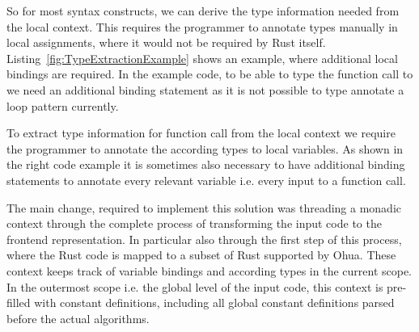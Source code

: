 So for most syntax constructs, we can derive the type information needed from the local context. This requires the programmer to annotate types manually in local assignments, where it would not be required by Rust itself. Listing~\ref{fig:TypeExtractionExample} shows an example, where additional local bindings are required. In the example code, to be able to type the function call to  we need an additional binding statement as it is not possible to type annotate a loop pattern currently. 

\begin{codefigure}[H]
\centering
\tabskip=0pt
\caption{To extract type information for function call from the local context we require the  programmer to annotate the according types to local variables. As shown in the right code example it is sometimes also necessary to have additional binding statements to annotate every relevant variable i.e. every input to a function call.}
\label{fig:TypeExtractionExample}
\end{codefigure}

 The main change, required to implement this solution was threading a monadic context through the complete process of transforming the input code to the frontend representation. In particular also through the first step of this process, where the Rust code is mapped to a subset of Rust supported by Ohua. These context keeps track of variable bindings and according types in the current scope. In the outermost scope i.e. the global level of the input code, this context is pre-filled with constant definitions, including all global constant definitions parsed before the actual algorithms. 

